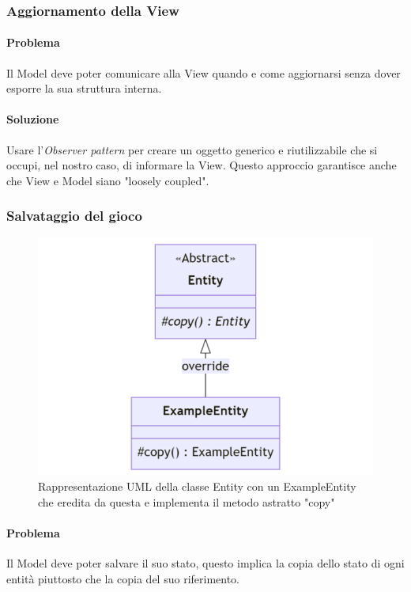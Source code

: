 \documentclass[a4paper,12pt]{report}
\begin{document}
\subsubsection*{Aggiornamento della View}
\paragraph{Problema} Il Model deve poter comunicare alla View quando e come aggiornarsi senza dover esporre la sua struttura interna.
\paragraph{Soluzione} Usare l'\textit{Observer pattern} per creare un oggetto generico e riutilizzabile che si occupi, nel nostro caso, di informare la View.
%
Questo approccio garantisce anche che View e Model siano "loosely coupled".

\subsubsection*{Salvataggio del gioco}
\begin{figure}[H]
	\centering{}
	\includegraphics[width=\textwidth]{img/Prototype.png}
	\caption{Rappresentazione UML della classe Entity con un ExampleEntity che eredita da questa e implementa il metodo astratto "copy"}
	\label{img:Prototype}
\end{figure}
\paragraph{Problema} Il Model deve poter salvare il suo stato, questo implica la copia dello stato di ogni entità piuttosto che la copia del suo riferimento.
\end{document}
